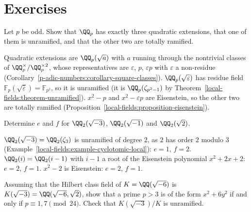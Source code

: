 \section{Exercises}\label{local-fields:section-exercises}

\begin{exercise}\label{local-fields:exercise-quadratic-extensions}
Let $p$ be odd. Show that $\QQ_p$ has exactly three quadratic extensions, that one of them is unramified, and that the other two are totally ramified.
\end{exercise}

\begin{solution}
Quadratic extensions are $\QQ_p(\sqrt a)$ with $a$ running through the nontrivial classes of $\QQ_p^\times/\QQ_p^{\times2}$, whose representatives are $\varepsilon$, $p$, $\varepsilon p$ with $\varepsilon$ a
non-residue (Corollary~\ref{p-adic-numbers:corollary-square-classes}). $\QQ_p(\sqrt\varepsilon)$ has residue field $\mathbb{F}_p(\sqrt{\bar\varepsilon}) = \mathbb{F}_{p^2}$, so it is unramified (it is
$\QQ_p(\zeta_{p^2 - 1})$ by Theorem~\ref{local-fields:theorem-unramified}). $x^2 - p$ and $x^2 - \varepsilon p$ are Eisenstein, so the other two are totally ramified
(Proposition~\ref{local-fields:proposition-eisenstein}).
\end{solution}

\begin{exercise}\label{local-fields:exercise-q2-extensions}
Determine $e$ and $f$ for $\QQ_2(\sqrt{-3})$, $\QQ_2(\sqrt{-1})$ and $\QQ_2(\sqrt 2)$.
\end{exercise}

\begin{solution}
$\QQ_2(\sqrt{-3}) = \QQ_2(\zeta_3)$ is unramified of degree $2$, as $2$ has order $2$ modulo $3$ (Example~\ref{local-fields:example-cyclotomic-local}): $e = 1$, $f = 2$. $\QQ_2(i) = \QQ_2(i - 1)$ with $i - 1$ a
root of the Eisenstein polynomial $x^2 + 2x + 2$: $e = 2$, $f = 1$. $x^2 - 2$ is Eisenstein: $e = 2$, $f = 1$.
\end{solution}

\begin{exercise}\label{local-fields:exercise-x2-6y2}
Assuming that the Hilbert class field of $K = \QQ(\sqrt{-6})$ is $K(\sqrt{-3}) = \QQ(\sqrt{-6}, \sqrt 2)$, show that a prime $p > 3$ is of the form $x^2 + 6y^2$ if and only if $p \equiv 1, 7 \pmod{24}$.
Check that $K(\sqrt{-3})/K$ is unramified.
\end{exercise}

